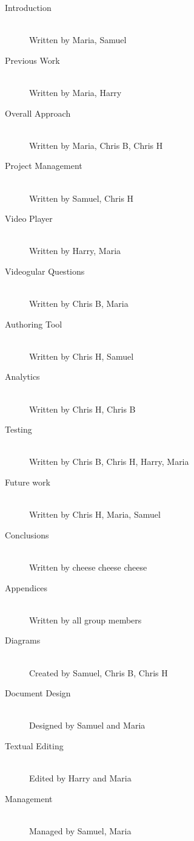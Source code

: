 \begin{description}
\item[Introduction] \hfill \\
	Written by Maria, Samuel
\item[Previous Work] \hfill \\
	Written by Maria, Harry
\item[Overall Approach] \hfill \\
	Written by Maria, Chris B, Chris H
\item[Project Management] \hfill \\
	Written by Samuel, Chris H
\item[Video Player] \hfill \\
	Written by Harry, Maria
\item[Videogular Questions] \hfill \\
	Written by Chris B, Maria
\item[Authoring Tool] \hfill \\
	Written by Chris H, Samuel
\item[Analytics] \hfill \\
	Written by Chris H, Chris B
\item[Testing] \hfill \\
	Written by Chris B, Chris H, Harry, Maria
\item[Future work] \hfill \\
	Written by Chris H, Maria, Samuel
\item[Conclusions] \hfill \\
	Written by cheese cheese cheese 
	\\
\item[Appendices] \hfill \\
	Written by all group members
	\\
\item[Diagrams] \hfill \\
	Created by Samuel, Chris B, Chris H
\item[Document Design] \hfill \\
	Designed by Samuel and Maria
\item[Textual Editing] \hfill \\
	Edited by Harry and Maria
\item[Management] \hfill \\
	Managed by Samuel, Maria 
\end{description}


